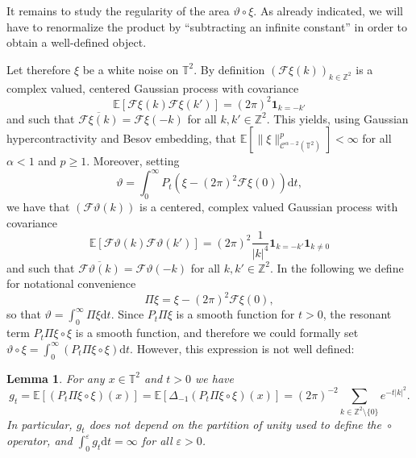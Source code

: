 \documentclass[a4paper,11pt]{article}
\newcommand{\mathd}{\mathrm{d}}
\newtheorem{lemma}[theorem]{Lemma}
\theoremstyle{remark}
\newcommand{\Z}{\mathbb{Z}}
\newcommand{\E}{\mathbb{E}}
\newcommand{\CC}{\ensuremath{\mathscr{C}}}
\newcommand{\CF}{\ensuremath{\mathscr{F}}}
\newcommand{\reso}{\,\mathord{\circ}\,}
\begin{document}
It remains to study the regularity of the area $\vartheta \reso \xi$. As already indicated, we will have to renormalize the product by ``subtracting an infinite constant'' in order to obtain a well-defined object.

Let therefore $\xi$ be a white noise on $\mathbb{T}^2$. By definition $(\CF \xi (k))_{k\in \Z^2}$ is a complex valued, centered Gaussian process with covariance
\[
   \E[\CF \xi (k) \CF \xi(k')] = (2\pi)^2 \mathbf{1}_{k = -k'}
\]
and such that $\overline{\CF \xi(k)} = \CF \xi(-k)$ for all $k,k' \in \Z^2$. This yields, using Gaussian hypercontractivity and Besov embedding, that $\E[\| \xi \|_{\CC^{\alpha-2}(\mathbb{T}^2)}^p] < \infty$ for all $\alpha < 1$ and $p \geqslant 1$. Moreover, setting
\[
   \vartheta = \int_0^\infty P_t (\xi - (2\pi)^2\CF\xi(0)) \mathd t,
\]
we have that $(\CF \vartheta(k))$ is a centered, complex valued Gaussian process with covariance
\[
   \E[ \CF \vartheta(k) \CF \vartheta(k')] = (2\pi)^2 \frac{1}{|k|^4} \mathbf{1}_{k = - k'} \mathbf{1}_{k \neq 0}
\]
and such that $\overline{\CF \vartheta(k)} = \CF \vartheta(-k)$ for all $k,k' \in \Z^2$. In the following we define for notational convenience
\[
   \Pi \xi = \xi - (2\pi)^2\CF\xi(0),
\]
so that $\vartheta = \int_0^\infty \Pi \xi \mathd t$. Since $P_t \Pi \xi$ is a smooth function for $t > 0$, the resonant term $P_t \Pi \xi \reso \xi$ is a smooth function, and therefore we could formally set $\vartheta \reso \xi = \int_0^\infty (P_t \Pi \xi \reso \xi) \mathd t$. However, this expression is not well defined:

\begin{lemma}\label{l:anderson area expectation}
   For any $x \in \mathbb{T}^2$ and $t > 0$ we have
   \[
      g_t = \E[(P_t \Pi \xi \reso \xi)(x)] = \E[ \Delta_{- 1} (P_t \Pi \xi \reso \xi ) ( x ) ] = (2\pi)^{-2} \sum_{k \in\mathbb{Z}^2\setminus \{0\}} e^{- t | k |^2}.
   \]
   In particular, $g_t$ does not depend on the partition of unity used to define the $\reso$ operator, and $\int_0^\varepsilon g_t \mathd t = \infty$ for all $\varepsilon > 0$.
\end{lemma}
\end{document}
